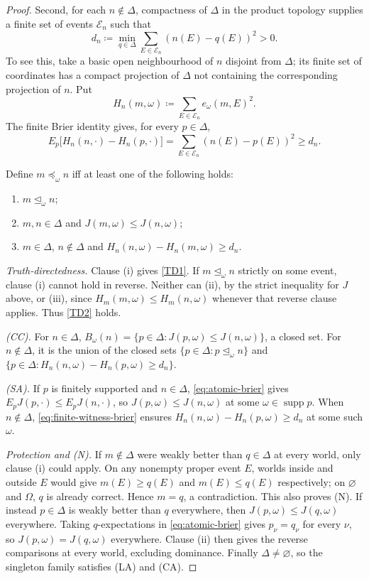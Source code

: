 \documentclass[11pt]{article}
\newenvironment{chgblockb}{\color{red}}{}
\theoremstyle{definition}
\theoremstyle{remark}
\newcommand{\supp}{\operatorname{supp}}
\begin{document}
\begin{chgblockb}
\begin{proof}
Second, for each $n\notin\Delta$, compactness of $\Delta$ in the product topology supplies a finite set of events $\mathcal E_n$ such that
\[
d_n\coloneqq\min_{q\in\Delta}\sum_{E\in\mathcal E_n}(n(E)-q(E))^2>0.
\]
To see this, take a basic open neighbourhood of $n$ disjoint from $\Delta$; its finite set of coordinates has a compact projection of $\Delta$ not containing the corresponding projection of $n$. Put
\[
H_n(m,\omega)\coloneqq\sum_{E\in\mathcal E_n}e_\omega(m,E)^2.
\]
The finite Brier identity gives, for every $p\in\Delta$,
\begin{equation}\label{eq:finite-witness-brier}
E_p\bigl[H_n(n,\cdot)-H_n(p,\cdot)\bigr]
=\sum_{E\in\mathcal E_n}(n(E)-p(E))^2\ge d_n.
\end{equation}

Define $m\preceq_\omega n$ iff at least one of the following holds:
\begin{enumerate}[label=(\roman*),leftmargin=3em]
\item $m\unlhd_\omega n$;
\item $m,n\in\Delta$ and $J(m,\omega)\le J(n,\omega)$;
\item $m\in\Delta$, $n\notin\Delta$ and $H_n(n,\omega)-H_n(m,\omega)\ge d_n$.
\end{enumerate}
\emph{Truth-directedness.} Clause (i) gives \ref{TD1}. If $m\unlhd_\omega n$ strictly on some event, clause (i) cannot hold in reverse. Neither can (ii), by the strict inequality for $J$ above, or (iii), since $H_m(m,\omega)\le H_m(n,\omega)$ whenever that reverse clause applies. Thus \ref{TD2} holds.

\emph{(CC).} For $n\in\Delta$, $B_\omega(n)=\{p\in\Delta:J(p,\omega)\le J(n,\omega)\}$, a closed set. For $n\notin\Delta$, it is the union of the closed sets $\{p\in\Delta:p\unlhd_\omega n\}$ and $\{p\in\Delta:H_n(n,\omega)-H_n(p,\omega)\ge d_n\}$.

\emph{(SA).} If $p$ is finitely supported and $n\in\Delta$, \eqref{eq:atomic-brier} gives $E_pJ(p,\cdot)\le E_pJ(n,\cdot)$, so $J(p,\omega)\le J(n,\omega)$ at some $\omega\in\supp p$. When $n\notin\Delta$, \eqref{eq:finite-witness-brier} ensures $H_n(n,\omega)-H_n(p,\omega)\ge d_n$ at some such $\omega$.

\emph{Protection and (N).} If $m\notin\Delta$ were weakly better than $q\in\Delta$ at every world, only clause (i) could apply. On any nonempty proper event $E$, worlds inside and outside $E$ would give $m(E)\ge q(E)$ and $m(E)\le q(E)$ respectively; on $\varnothing$ and $\Omega$, $q$ is already correct. Hence $m=q$, a contradiction. This also proves (N). If instead $p\in\Delta$ is weakly better than $q$ everywhere, then $J(p,\omega)\le J(q,\omega)$ everywhere. Taking $q$-expectations in \eqref{eq:atomic-brier} gives $p_\nu=q_\nu$ for every $\nu$, so $J(p,\omega)=J(q,\omega)$ everywhere. Clause (ii) then gives the reverse comparisons at every world, excluding dominance. Finally $\Delta\ne\varnothing$, so the singleton family satisfies (LA) and (CA).
\end{proof}


\end{chgblockb}
\end{document}
